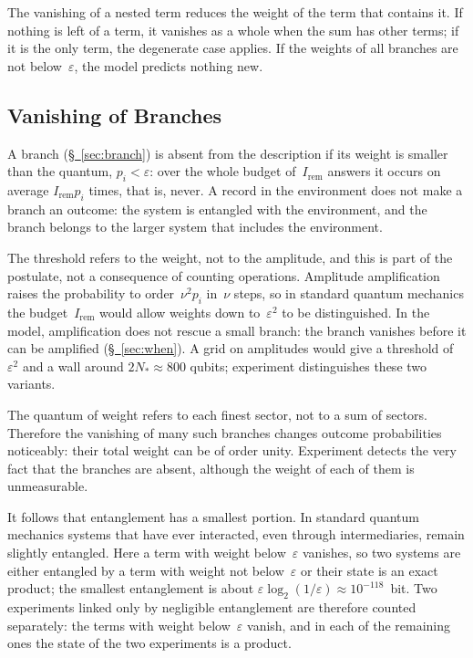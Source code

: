 \documentclass[11pt,a4paper]{article}
\newcommand{\Ost}{I_{\mathrm{rem}}}
\begin{document}
The vanishing of a nested term reduces the weight of the term that contains it. If nothing is left of a term, it vanishes as a whole when the sum has other terms; if it is the only term, the degenerate case applies. If the weights of all branches are not below~$\varepsilon$, the model predicts nothing new.

\subsection{Vanishing of Branches}
\label{sec:vanishing}

A branch (\hyperref[sec:branch]{\S~\ref*{sec:branch}}) is absent from the description if its weight is smaller than the quantum, $p_i<\varepsilon$: over the whole budget of~$\Ost$ answers it occurs on average $\Ost p_i$ times, that is, never. A record in the environment does not make a branch an outcome: the system is entangled with the environment, and the branch belongs to the larger system that includes the environment.

The threshold refers to the weight, not to the amplitude, and this is part of the postulate, not a consequence of counting operations. Amplitude amplification~\cite{grover1996,brassard2002} raises the probability to order~$\nu^2p_i$ in~$\nu$ steps, so in standard quantum mechanics the budget~$\Ost$ would allow weights down to~$\varepsilon^2$ to be distinguished. In the model, amplification does not rescue a small branch: the branch vanishes before it can be amplified (\hyperref[sec:when]{\S~\ref*{sec:when}}). A grid on amplitudes would give a threshold of~$\varepsilon^2$ and a wall around $2N_*\approx800$ qubits; experiment distinguishes these two variants.

The quantum of weight refers to each finest sector, not to a sum of sectors. Therefore the vanishing of many such branches changes outcome probabilities noticeably: their total weight can be of order unity. Experiment detects the very fact that the branches are absent, although the weight of each of them is unmeasurable.

It follows that entanglement has a smallest portion. In standard quantum mechanics systems that have ever interacted, even through intermediaries, remain slightly entangled. Here a term with weight below~$\varepsilon$ vanishes, so two systems are either entangled by a term with weight not below~$\varepsilon$ or their state is an exact product; the smallest entanglement is about $\varepsilon\log_2(1/\varepsilon)\approx10^{-118}$~bit. Two experiments linked only by negligible entanglement are therefore counted separately: the terms with weight below~$\varepsilon$ vanish, and in each of the remaining ones the state of the two experiments is a product.
\end{document}
